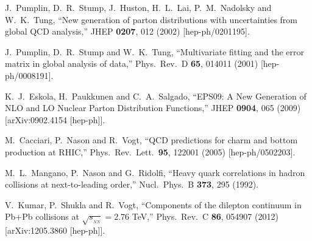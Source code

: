 \documentclass[aps,prc,preprint,superscriptaddress,showpacs,showkeys]{revtex4-1}
\begin{document}
\begin{thebibliography}{100}
  J.~Pumplin, D.~R.~Stump, J.~Huston, H.~L.~Lai, P.~M.~Nadolsky and W.~K.~Tung,
  ``New generation of parton distributions with uncertainties from global QCD analysis,''
  JHEP {\bf 0207}, 012 (2002)
  [hep-ph/0201195].

 
  J.~Pumplin, D.~R.~Stump and W.~K.~Tung,
  ``Multivariate fitting and the error matrix in global analysis of data,''
  Phys.\ Rev.\ D {\bf 65}, 014011 (2001)
  [hep-ph/0008191].


  K.~J.~Eskola, H.~Paukkunen and C.~A.~Salgado,
  ``EPS09: A New Generation of NLO and LO Nuclear Parton Distribution Functions,''
  JHEP {\bf 0904}, 065 (2009)
  [arXiv:0902.4154 [hep-ph]].

  M.~Cacciari, P.~Nason and R.~Vogt,
  ``QCD predictions for charm and bottom production at RHIC,''
  Phys.\ Rev.\ Lett.\  {\bf 95}, 122001 (2005)
  [hep-ph/0502203].



  M.~L.~Mangano, P.~Nason and G.~Ridolfi,
  ``Heavy quark correlations in hadron collisions at next-to-leading order,''
  Nucl.\ Phys.\ B {\bf 373}, 295 (1992).


  V.~Kumar, P.~Shukla and R.~Vogt,
  ``Components of the dilepton continuum in Pb+Pb collisions at $\sqrt{s_{_{NN}}} = 2.76 $ TeV,''
  Phys.\ Rev.\ C {\bf 86}, 054907 (2012)
  [arXiv:1205.3860 [hep-ph]].




\end{thebibliography}
\end{document}
